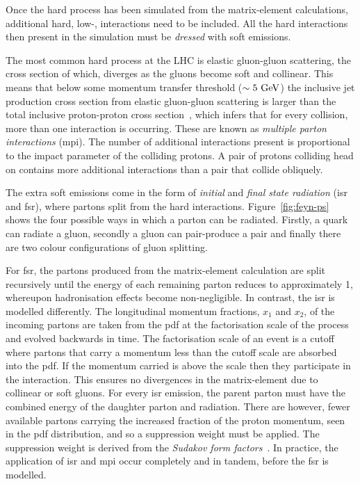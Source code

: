 Once the hard process has been simulated from the matrix-element calculations, additional hard, low-\pt{}, interactions need to be included. 
All the hard interactions then present in the simulation must be \textit{dressed} with soft emissions.

The most common hard process at the LHC is elastic gluon-gluon scattering, the cross section of which, diverges as the gluons become soft and collinear.
This means that below some momentum transfer threshold ($\sim5\mathrm{~Ge\hspace{-.08em}V}^{}$) the inclusive jet production cross section from elastic gluon-gluon scattering is larger than the total inclusive proton-proton cross section~\cite{Gen:MPI_1,Gen:MPI_2}, which infers that for every collision, more than one interaction is occurring.
These are known as \textit{multiple parton interactions} (\acrshort{mpi}).
The number of additional interactions present is proportional to the impact parameter of the colliding protons.
A pair of protons colliding head on contains more additional interactions than a pair that collide obliquely.

The extra soft emissions come in the form of \textit{initial} and \textit{final state radiation} (\acrshort{isr} and \acrshort{fsr}), where partons split from the hard interactions.
Figure~\ref{fig:feyn-ps} shows the four possible ways in which a parton can be radiated.
Firstly, a quark can radiate a gluon, secondly a gluon can pair-produce a \qqbar{} pair and finally there are two colour configurations of gluon splitting.


For \acrshort{fsr}, the partons produced from the matrix-element calculation are split recursively until the energy of each remaining parton reduces to approximately 1\GeV{}, whereupon hadronisation effects become non-negligible.
In contrast, the \acrshort{isr} is modelled differently.
The longitudinal momentum fractions, $x_1$ and $x_2$, of the incoming partons are taken from the \acrshort{pdf} at the factorisation scale of the process and evolved backwards in time. 
The factorisation scale of an event is a cutoff where partons that carry a momentum less than the cutoff scale are absorbed into the \acrshort{pdf}.
If the momentum carried is above the scale then they participate in the interaction.
This ensures no divergences in the matrix-element due to collinear or soft gluons.
For every \acrshort{isr} emission, the parent parton must have the combined energy of the daughter parton and radiation.
There are however, fewer available partons carrying the increased fraction of the proton momentum, seen in the \acrshort{pdf} distribution, and so a suppression weight must be applied.
The suppression weight is derived from the \textit{Sudakov form factors}~\cite{Gen:Sudokov}.
In practice, the application of \acrshort{isr} and \acrshort{mpi} occur completely and in tandem, before the \acrshort{fsr} is modelled.

